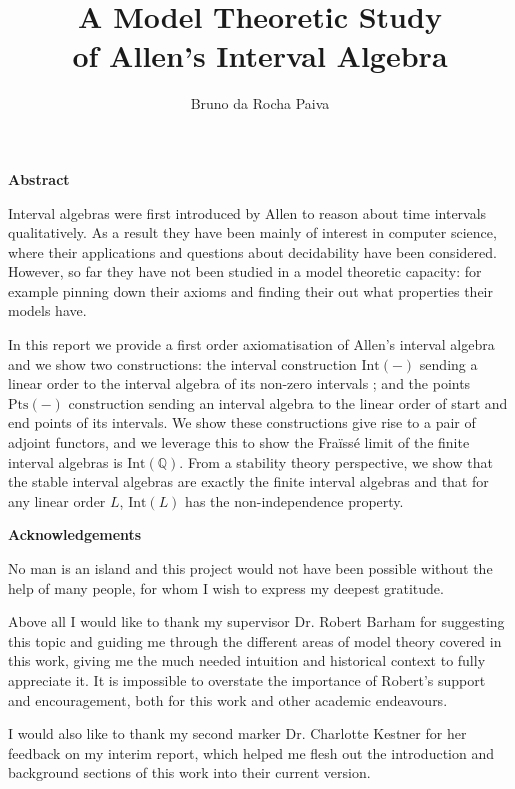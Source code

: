 \documentclass[11pt %
              ]{article}
\title{A Model Theoretic Study \\ of Allen's Interval Algebra}
\author{Bruno da Rocha Paiva}
\date{} %
\newcommand{\Q}{\mathbb{Q}}
\newcommand{\inter}[1][-]{\text{Int}\left(#1\right)}
\newcommand{\points}[1][-]{\text{Pts}\left(#1\right)}
\theoremstyle{plain}
\theoremstyle{definition}
\theoremstyle{remark}
\begin{document}
\pagestyle{empty}



\newpage
\hspace{0pt}
\vfill
\begin{center}
    \textbf{Abstract}
\end{center}
Interval algebras were first introduced by Allen to reason about time intervals qualitatively. As
a result they have been mainly of interest in computer science, where their applications and
questions about decidability have been considered. However, so far they have not been studied in a
model theoretic capacity: for example pinning down their axioms and finding their out what
properties their models have.

In this report we provide a first order axiomatisation of Allen's interval algebra and we show
two constructions: the interval construction $\inter$ sending a linear order to the interval algebra
of its non-zero intervals ; and the points $\points$ construction sending an interval algebra to
the linear order of start and end points of its intervals. We show these constructions give rise to
a pair of adjoint functors, and we leverage this to show the Fraïssé limit of the finite interval
algebras is $\inter[\Q]$. From a stability theory perspective, we show that the stable interval
algebras are exactly the finite interval algebras and that for any linear order $L$, $\inter[L]$
has the non-independence property.
\vfill
\hspace{0pt}

\newpage
\hspace{0pt}
\vfill
\begin{center}
    \textbf{Acknowledgements}
\end{center}
No man is an island and this project would not have been possible without the help of many people,
for whom I wish to express my deepest gratitude.

Above all I would like to thank my supervisor Dr. Robert Barham for suggesting this topic and
guiding me through the different areas of model theory covered in this work, giving me the much
needed intuition and historical context to fully appreciate it. It is impossible
to overstate the importance of Robert's support and encouragement, both for this work and other
academic endeavours.

I would also like to thank my second marker Dr. Charlotte Kestner for her feedback on my interim
report, which helped me flesh out the introduction and background sections of this work into their
current version.
\end{document}
